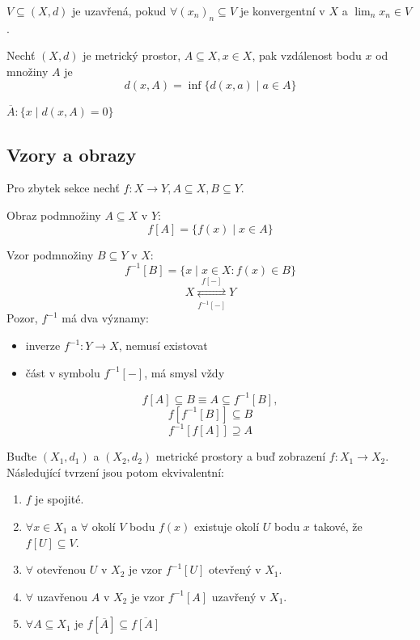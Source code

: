 \documentclass[../main.tex]{subfiles}
\begin{document}
\begin{definition}
	$V \subseteq (X,d)$ je uzavřená, pokud $\forall (x_n)_n \subseteq V$ je konvergentní
	v $X$ a $\lim_n x_n \in V$.
\end{definition}

\begin{definition}
	Nechť $(X,d)$ je metrický prostor, $A \subseteq X, x\in X$, pak vzdálenost bodu $x$ od množiny $A$ je
	\[d(x,A) = \inf\{d(x,a)\mid a \in A\}\]
\end{definition}

\begin{definition}[Uzávěr]
	$\overline{A} : \{x \mid d(x,A) = 0\}$
\end{definition}

\subsection{Vzory a obrazy}
Pro zbytek sekce nechť $f: X \rightarrow Y, A \subseteq X, B \subseteq Y$.

\begin{definition}[Obraz]
	Obraz podmnožiny $A\subseteq X$ v $Y$:
	\[f[A] = \{f(x) \mid x \in A\}\]
\end{definition}

\begin{definition}[Vzor]
	Vzor podmnožiny $B\subseteq Y$ v $X$:
	\[f^{-1}[B] = \{x \mid x \in X: f(x) \in B\}\]
	\[X \underset{f^{-1}[-]}{\stackrel{f[-]}{\rightleftarrows}} Y\]
	Pozor, $f^{-1}$ má dva významy:
	\begin{itemize}
		\item inverze $f^{-1}:Y \rightarrow X$, nemusí existovat
		\item část v symbolu $f^{-1}[-]$, má smysl vždy
	\end{itemize}
\end{definition}

\begin{lemma}
	\[f[A] \subseteq B \equiv A \subseteq f^{-1}[B],\]
	\[f[f^{-1}[B]] \subseteq B\]
	\[f^{-1}[f[A]] \supseteq A\]
\end{lemma}

\begin{theorem}
	Buďte $(X_1, d_1)$ a $(X_2, d_2)$ metrické prostory a buď zobrazení $f: X_1 \to X_2$. Následující tvrzení
	jsou potom ekvivalentní:
	\begin{enumerate}
	    \item $f$ je spojité.
	    \item $\forall x \in X_1$ a $\forall$ okolí $V$ bodu $f(x)$ existuje okolí $U$ bodu $x$ takové, že
	        $f[U] \subseteq V$.
	    \item $\forall$ otevřenou $U$ v $X_2$ je vzor $f^{-1}[U]$ otevřený v $X_1$.
	    \item $\forall$ uzavřenou $A$ v $X_2$ je vzor $f^{-1}[A]$ uzavřený v $X_1$.
	    \item $\forall A \subseteq X_1$ je $f[\overline{A}] \subseteq \overline{f[A]}$
	\end{enumerate}
\end{theorem}
\end{document}
